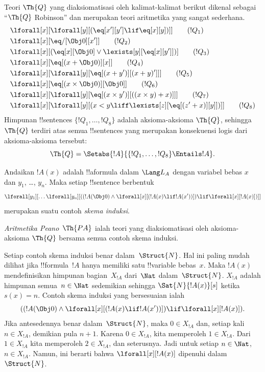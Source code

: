 \documentclass[../../../include/open-logic-section]{subfiles}
\begin{document}
\begin{defn}
Teori $\Th{Q}$ yang diaksiomatisasi oleh kalimat-kalimat berikut dikenal
sebagai ``$\Th{Q}$ Robinson'' dan merupakan teori aritmetika yang sangat
sederhana.
\begin{align*}
& \lforall[x][\lforall[y][(\eq[x'][y'] \lif \eq[x][y])]] \tag{$!Q_1$}\\
& \lforall[x][\eq/[\Obj 0][x']] \tag{$!Q_2$}\\
& \lforall[x][(\eq[x][\Obj 0] \lor \lexists[y][\eq[x][y']])] \tag{$!Q_3$}\\
& \lforall[x][\eq[(x + \Obj 0)][x]] \tag{$!Q_4$}\\
& \lforall[x][\lforall[y][\eq[(x + y')][(x + y)']]] \tag{$!Q_5$}\\
& \lforall[x][\eq[(x \times \Obj 0)][\Obj 0]] \tag{$!Q_6$}\\
& \lforall[x][\lforall[y][\eq[(x \times y')][((x \times y) + x)]]] \tag{$!Q_7$}\\
& \lforall[x][\lforall[y][(x < y \liff \lexists[z][\eq[(z' + x)][y]])]] \tag{$!Q_8$}
\end{align*}
Himpunan !!{sentence}s $\{!Q_1, \dots, !Q_8\}$ adalah aksioma-aksioma
$\Th{Q}$, sehingga $\Th{Q}$ terdiri atas semua !!{sentence}s yang merupakan
konsekuensi logis dari aksioma-aksioma tersebut:
\[
\Th{Q} = \Setabs{!A}{\{!Q_1, \dots, !Q_8\} \Entails !A}.
\]
\end{defn}

\begin{defn}
Andaikan $!A(x)$ adalah !!a{formula} dalam $\Lang L_A$ dengan variabel bebas
$x$ dan $y_1$, \dots, $y_n$. Maka setiap !!{sentence} berbentuk
\[
\lforall[y_1][\dots\lforall[y_n][((!A(\Obj 0) \land \lforall[x][(!A(x)
\lif !A(x'))]) \lif \lforall[x][!A(x)])]]
\]
merupakan suatu contoh \emph{skema induksi}.

\emph{Aritmetika Peano}~$\Th{PA}$ ialah teori yang diaksiomatisasi oleh
aksioma-aksioma $\Th{Q}$ bersama semua contoh skema induksi.
\end{defn}

\begin{explain}
Setiap contoh skema induksi benar dalam~$\Struct{N}$. Hal ini paling mudah
dilihat jika !!{formula}~$!A$ hanya memiliki satu !!{variable} bebas~$x$.
Maka $!A(x)$ mendefinisikan himpunan bagian~$X_{!A}$ dari~$\Nat$
dalam~$\Struct{N}$. $X_{!A}$ adalah himpunan semua~$n \in \Nat$ sedemikian
sehingga $\Sat{N}{!A(x)}[s]$ ketika $s(x) = n$. Contoh skema induksi yang
bersesuaian ialah
\[
((!A(\Obj 0) \land \lforall[x][(!A(x) \lif !A(x'))]) \lif
  \lforall[x][!A(x)]).
\]
Jika antesedennya benar dalam~$\Struct{N}$, maka $0 \in X_{!A}$ dan, setiap
kali $n \in X_{!A}$, demikian pula $n+1$. Karena $0 \in X_{!A}$,
kita memperoleh $1 \in X_{!A}$. Dari $1 \in X_{!A}$ kita memperoleh
$2 \in X_{!A}$, dan seterusnya. Jadi untuk setiap $n \in \Nat$,
$n \in X_{!A}$. Namun, ini berarti bahwa $\lforall[x][!A(x)]$ dipenuhi
dalam~$\Struct{N}$.
\end{explain}
\end{document}

